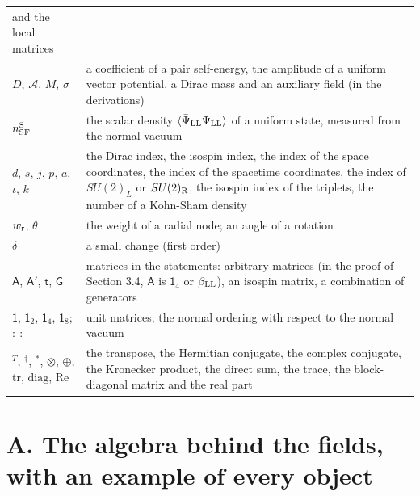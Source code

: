\documentclass[
  10pt,
]{article}
\begin{document}
\begin{longtable}[]{@{}
  >{\raggedright\arraybackslash}p{}
  >{\raggedright\arraybackslash}p{}@{}}
and the local matrices \\
\(D\), \(\mathcal A\), \(M\), \(\sigma\) & a coefficient of a pair
self-energy, the amplitude of a uniform vector potential, a Dirac mass
and an auxiliary field (in the derivations) \\
\(n^{\rm S}_{\rm SF}\) & the scalar density
\(\langle\bar\Psi_{\rm LL}\Psi_{\rm LL}\rangle\) of a uniform state,
measured from the normal vacuum \\
\(d\), \(s\), \(j\), \(p\), \(a\), \(\iota\), \(k\) & the Dirac index,
the isospin index, the index of the space coordinates, the index of the
spacetime coordinates, the index of \(SU(2)_L\) or \(SU(2)_{\rm R}\),
the isospin index of the triplets, the number of a Kohn-Sham density \\
\(w_{\rm r}\), \(\theta\) & the weight of a radial node; an angle of a
rotation \\
\(\delta\) & a small change (first order) \\
\(\mathsf A\), \(\mathsf A'\), \(\mathsf t\), \(\mathsf G\) & matrices
in the statements: arbitrary matrices (in the proof of Section 3.4,
\(\mathsf A\) is \(\mathsf 1_4\) or \(\beta_{\rm LL}\)), an isospin
matrix, a combination of generators \\
\(\mathsf 1\), \(\mathsf 1_2\), \(\mathsf 1_4\), \(\mathsf 1_8\);
\({:}\ {:}\) & unit matrices; the normal ordering with respect to the
normal vacuum \\
\({}^T\), \({}^\dagger\), \({}^*\), \(\otimes\), \(\oplus\),
\(\mathrm{tr}\), \(\mathrm{diag}\), \(\mathrm{Re}\) & the transpose, the
Hermitian conjugate, the complex conjugate, the Kronecker product, the
direct sum, the trace, the block-diagonal matrix and the real part \\
\end{longtable}

\hypertarget{a.-the-algebra-behind-the-fields-with-an-example-of-every-object}{%
\section{A. The algebra behind the fields, with an example of every
object}\label{a.-the-algebra-behind-the-fields-with-an-example-of-every-object}}
\end{document}
